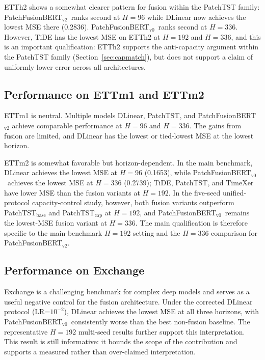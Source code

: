 \documentclass{ieeeaccess}
\newcommand{\modelvzero}{PatchFusionBERT$_{\text{v0}}$\xspace}
\newcommand{\modelvtwo}{PatchFusionBERT$_{\text{v2}}$\xspace}
\begin{document}
ETTh2 shows a somewhat clearer pattern for fusion within the PatchTST family:
\modelvtwo\ ranks second at $H=96$ while DLinear now achieves the lowest MSE there
(0.2836). \modelvzero\ ranks second at $H=336$. However,
TiDE has the lowest MSE on ETTh2 at $H=192$ and $H=336$, and this is
an important qualification: ETTh2 supports the anti-capacity argument within the
PatchTST family (Section~\ref{sec:capmatch}), but does not support a claim of
uniformly lower error across all architectures.

\subsection{Performance on ETTm1 and ETTm2}
ETTm1 is neutral. Multiple models DLinear, PatchTST, and \modelvtwo achieve
comparable performance at $H=96$ and $H=336$. The gains from fusion are limited, and
DLinear has the lowest or tied-lowest MSE at the lowest horizon.

ETTm2 is somewhat favorable but horizon-dependent. In the main benchmark,
DLinear achieves the lowest MSE at $H=96$ (0.1653), while \modelvzero\
achieves the lowest MSE at $H=336$ (0.2739); TiDE, PatchTST, and TimeXer have
lower MSE than the fusion variants at $H=192$. In the five-seed
unified-protocol capacity-control study, however, both fusion variants outperform
PatchTST$_\text{base}$ and PatchTST$_\text{cap}$ at $H=192$, and \modelvzero\
remains the lowest-MSE fusion variant at $H=336$. The main qualification is
therefore specific to the main-benchmark $H=192$ setting and the $H=336$
comparison for \modelvtwo.

\subsection{Performance on Exchange}
Exchange is a challenging benchmark for complex deep models and serves as a useful
negative control for the fusion architecture. Under the corrected DLinear protocol
(LR=$10^{-2}$), DLinear achieves the lowest MSE at all three horizons, with
\modelvzero\ consistently worse than the best non-fusion baseline. The
representative $H=192$ multi-seed results further support this interpretation. This result is still
informative: it bounds the scope of the contribution and supports a measured rather
than over-claimed interpretation.
\end{document}
